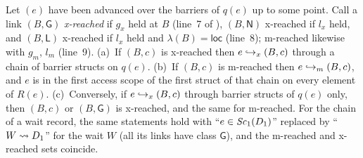 \begin{lemma}\label{lem:chain}
Let $(e)$ have been advanced over the barriers of $q(e)$ up to some point. Call a link $(B,\mathsf{G})$
\emph{x-reached} if $g_x$ held at $B$ (line~7 of ), $(B,\mathsf{N})$ x-reached if $l_x$ held, and
$(B,\mathsf{L})$ x-reached if $l_x$ held and $\lambda(B) = \mathsf{loc}$ (line~8); m-reached likewise with $g_m$,
$l_m$ (line~9).
(a)~If $(B,c)$ is x-reached then $e \hookrightarrow_x (B,c)$ through a chain of barrier structs on $q(e)$.
(b)~If $(B,c)$ is m-reached then $e \hookrightarrow_m (B,c)$, and $e$ is in the first access scope of the first struct of that
chain on every element of $R(e)$.
(c)~Conversely, if $e \hookrightarrow_x (B,c)$ through barrier structs of $q(e)$ only, then $(B,c)$ or $(B,\mathsf{G})$ is
x-reached, and the same for m-reached.
For the chain of a wait record, the same statements hold with ``$e \in \mathit{Sc}_{1}(D_1)$'' replaced by ``$W \rightsquigarrow D_1$''
for the wait $W$ (all its links have class $\mathsf{G}$), and the m-reached and x-reached sets coincide.
\end{lemma}
